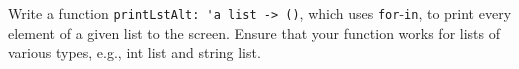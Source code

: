Write a function \mbox{\lstinline{printLstAlt: 'a list -> ()}}, which uses \lstinline{for}-\lstinline{in}, to print every element of a given list to the screen. Ensure that your function works for lists of various types, e.g., int list and string list.
